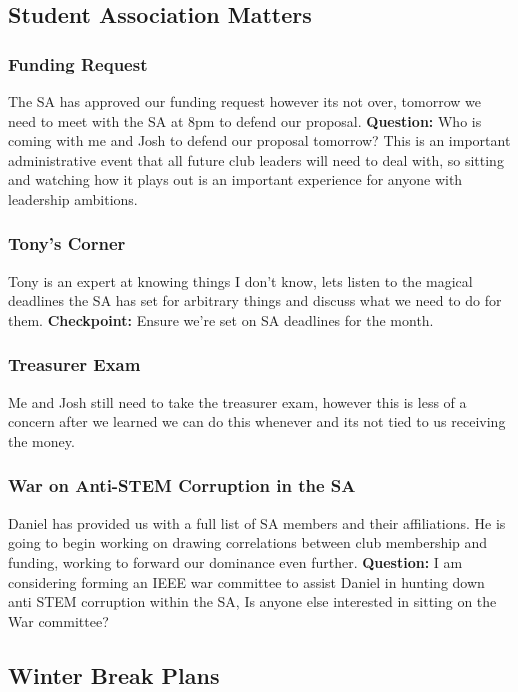 \documentclass{article}
\begin{document}
\subsection{Student Association Matters}
\subsubsection{Funding Request}
The SA has approved our funding request however its not over, tomorrow we need to meet with the SA at 8pm to defend our proposal. 
\newline\newline
\textbf{Question:} Who is coming with me and Josh to defend our proposal tomorrow? This is an important administrative event that all future club leaders will need to deal with, so sitting and watching how it plays out is an important experience for anyone with leadership ambitions.
\subsubsection{Tony's Corner}Tony is an expert at knowing things I don't know, lets listen to the magical deadlines the SA has set for arbitrary things and discuss what we need to do for them.
\newline\newline
\textbf{Checkpoint:} Ensure we're set on SA deadlines for the month. 
\subsubsection{Treasurer Exam}
Me and Josh still need to take the treasurer exam, however this is less of a concern after we learned we can do this whenever and its not tied to us receiving the money. 
\subsubsection{War on Anti-STEM Corruption in the SA}
Daniel has provided us with a full list of SA members and their affiliations. He is going to begin working on drawing correlations between club membership and funding, working to forward our dominance even further. 
\newline\newline
\textbf{Question:} I am considering forming an IEEE war committee to assist Daniel in hunting down anti STEM corruption within the SA, Is anyone else interested in sitting on the War committee? 

\subsection{Winter Break Plans}
\end{document}

